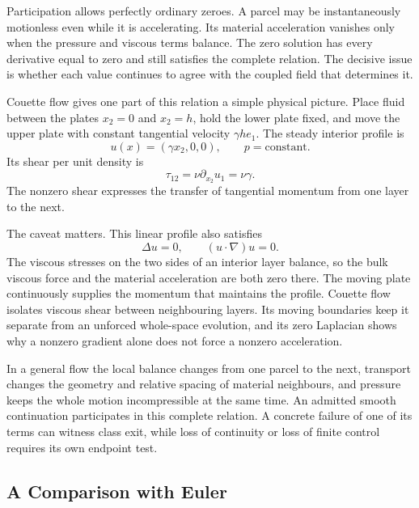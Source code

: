 Participation allows perfectly ordinary zeroes.
A parcel may be instantaneously motionless even while it is accelerating.
Its material acceleration vanishes only when the pressure and viscous terms balance.
The zero solution has every derivative equal to zero and still satisfies the complete relation.
The decisive issue is whether each value continues to agree with the coupled field that determines it.

Couette flow gives one part of this relation a simple physical picture.
Place fluid between the plates \(x_2=0\) and \(x_2=h\), hold the lower plate fixed, and move the upper plate with constant tangential velocity \(\gamma h e_1\).
The steady interior profile is
\[
  u(x)=(\gamma x_2,0,0),
  \qquad
  p=\text{constant}.
\]
Its shear per unit density is
\[
  \tau_{12}=\nu\partial_{x_2}u_1=\nu\gamma.
\]
The nonzero shear expresses the transfer of tangential momentum from one layer to the next.

The caveat matters.
This linear profile also satisfies
\[
  \Delta u=0,
  \qquad
  (u\cdot\nabla)u=0.
\]
The viscous stresses on the two sides of an interior layer balance, so the bulk viscous force and the material acceleration are both zero there.
The moving plate continuously supplies the momentum that maintains the profile.
Couette flow isolates viscous shear between neighbouring layers.
Its moving boundaries keep it separate from an unforced whole-space evolution, and its zero Laplacian shows why a nonzero gradient alone does not force a nonzero acceleration.

In a general flow the local balance changes from one parcel to the next, transport changes the geometry and relative spacing of material neighbours, and pressure keeps the whole motion incompressible at the same time.
An admitted smooth continuation participates in this complete relation.
A concrete failure of one of its terms can witness class exit, while loss of continuity or loss of finite control requires its own endpoint test.

\subsection{A Comparison with Euler}\label{sub:AComparisonWithEuler}

